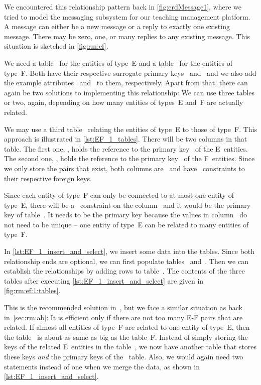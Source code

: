 We encountered this relationship pattern back in \cref{fig:erdMessage1}, where we tried to model the messaging subsystem for our teaching management platform.
A message can either be a new message or a reply to exactly one existing message.
There may be zero, one, or many replies to any existing message.
This situation is sketched in \cref{fig:rm:ef}.

We need a table~ for the entities of type~E and a table~ for the entities of type~F.
Both have their respective surrogate primary keys~ and~ and we also add the example attributes~ and~ to them, respectively.
Apart from that, there can again be two solutions to implementing this relationship:
We can use three tables or two, again, depending on how many entities of types~E and~F are actually related.

We may use a third table~ relating the entities of type~E to those of type~F.
This approach is illustrated in \cref{lst:EF_1_tables}.
There will be two columns in that table.
The first one, , holds the reference to the primary key~ of the E~entities.
The second one, , holds the reference to the primary key~ of the F~entities.
Since we only store the pairs that exist, both columns are~ and have~ constraints to their respective foreign keys.

Since each entity of type~F can only be connected to at most one entity of type~E, there will be a~ constraint on the column~ and it would be the primary key of table~.
It needs to be the primary key because the values in column~ do not need to be unique -- one entity of type~E can be related to many entities of type~F.

In \cref{lst:EF_1_insert_and_select}, we insert some data into the tables.
Since both relationship ends are optional, we can first populate tables~ and~.
Then we can establish the relationships by adding rows to table~.
The contents of the three tables after executing \cref{lst:EF_1_insert_and_select} are given in \cref{fig:rm:ef:1:tables}.

This is the recommended solution in~\cite{S2024D:MEDTRDM}, but we face a similar situation as back in~\cref{sec:rm:ab}:
It is efficient only if there are not too many E\nobreakdashes-F pairs that are related.
If almost all entities of type~F are related to one entity of type~E, then the table~ is about as same as big as the table~F.
Instead of simply storing the keys of the related E~entities in the table~, we now have another table that stores these keys \emph{and} the primary keys of the ~table.
Also, we would again need two  statements instead of one when we merge the data, as shown in \cref{lst:EF_1_insert_and_select}.

